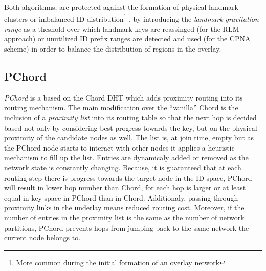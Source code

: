 \documentclass[a4paper,10pt]{article}
\begin{document}
Both algorithms, are protected against the formation of physical landmark clusters or imbalanced ID distribution\footnote{More common during the initial formation of an overlay network} , by introducing the \emph{landmark gravitation range} as a theshold over which landmark keys are reassinged (for the RLM approach) or unutilized ID prefix ranges are detected and used (for the CPNA scheme) in order to balance the distribution of regions in the overlay.

\subsection{PChord}
\emph{PChord}\cite{hong_pchord_2005} is a based on the Chord DHT which adds proximity routing into its routing mechanism. The main modification over the ``vanilla'' Chord is the inclusion of a \emph{proximity list} into its routing table so that the next hop is decided based not only by considering best progress towards the key, but on the physical proximity of the candidate nodes as well. The list is, at join time, empty but as the PChord node starts to interact with other nodes it applies a heuristic mechanism to fill up the list. Entries are dynamicaly added or removed as the network state is constantly changing. Because, it is guaranteed that at each routing step there is progress towards the target node in the ID space, PChord will result in lower hop number than Chord, for each hop is larger or at least equal in key space in PChord than in Chord. Additionaly, passing through proximity links in the underlay means reduced routing cost. Moreover, if the number of entries in the proximity list is the same as the number of network partitions, PChord prevents hops from jumping back to the same network the current node belongs to.
\end{document}
